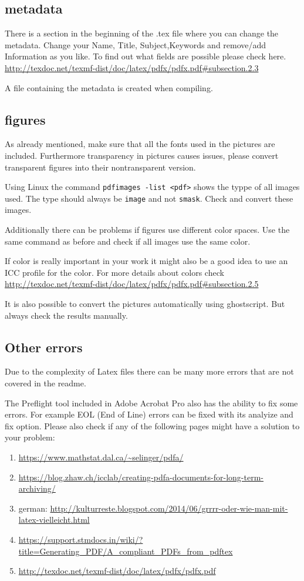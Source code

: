 \documentclass{article}
\begin{document}
\subsection{metadata}
There is a section in the beginning of the .tex file where you can change the metadata.
Change your Name, Title, Subject,Keywords and remove/add Information as you like. To find out what fields are possible please check here. \url{http://texdoc.net/texmf-dist/doc/latex/pdfx/pdfx.pdf#subsection.2.3}

A file containing the metadata is created when compiling. 

\subsection{figures}
As already mentioned, make sure that all the fonts used in the pictures are included. Furthermore transparency in pictures causes issues, please convert transparent figures into their nontransparent version. 

Using Linux the command \verb|pdfimages -list <pdf>| shows the typpe of all images used. The type should always be \verb|image| and not \verb|smask|. Check and convert these images.

Additionally there can be problems if figures use different color spaces. Use the same command as before and check if all images use the same color. 

If color is really important in your work it might also be a good idea to use an ICC profile for the color. 
For more details about colors check \url{http://texdoc.net/texmf-dist/doc/latex/pdfx/pdfx.pdf#subsection.2.5}

It is also possible to convert the pictures automatically using ghostscript. But always check the results manually. 

\subsection{Other errors}
Due to the complexity of Latex files there can be many more errors that are not covered in the readme.

The Preflight tool included in Adobe Acrobat Pro also has the ability to fix some errors. For example EOL (End of Line) errors can be fixed with its analyize and fix option. 
Please also check if any of the following pages might have a solution to your problem:
\begin{enumerate}
    \item \url{https://www.mathstat.dal.ca/~selinger/pdfa/}
    \item \url{https://blog.zhaw.ch/icclab/creating-pdfa-documents-for-long-term-archiving/}
    \item german: \url{http://kulturreste.blogspot.com/2014/06/grrrr-oder-wie-man-mit-latex-vielleicht.html}
    \item \url{https://support.stmdocs.in/wiki/?title=Generating_PDF/A_compliant_PDFs_from_pdftex}
    \item \url{http://texdoc.net/texmf-dist/doc/latex/pdfx/pdfx.pdf}
\end{enumerate}
\end{document}
